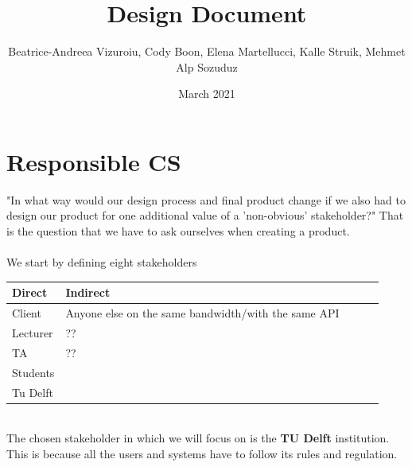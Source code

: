 \documentclass{article}
\title{Design Document}
\author{Beatrice-Andreea Vizuroiu, Cody Boon, Elena Martellucci, Kalle Struik, Mehmet Alp Sozuduz }
\date{March 2021}
\begin{document}
\maketitle

\section{Responsible CS}
"In what way would our design process and final product change if we also had to design our product for one additional value of a 'non-obvious' stakeholder?" That is the question that we have to ask ourselves when creating a product.\\
\\We start by defining eight stakeholders\\
\begin{center}
    \begin{tabular}{ | l | l | l | l | l |}
    \hline
    Direct    & Indirect \\ \hline \hline
    Client  & Anyone else on the same bandwidth/with the same API  \\ \hline
    Lecturer  &??  \\ \hline
    TA  &??  \\ \hline
    Students  &   \\ \hline
    Tu Delft  &   \\ \hline
    \end{tabular}
\end{center}

\\The chosen stakeholder in which we will focus on is the \textbf{TU Delft} institution.
This is because all the users and systems have to follow its rules and regulation.\\
\end{document}
